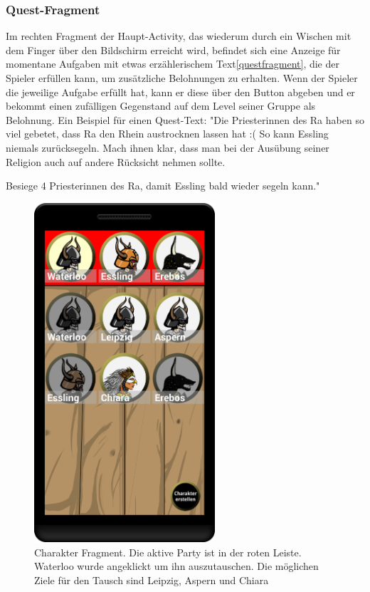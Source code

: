 \documentclass[extern,palatino]{cgBA}
\begin{document}
\subsubsection{Quest-Fragment}
Im rechten Fragment der Haupt-Activity, das wiederum durch ein Wischen mit dem Finger über den Bildschirm erreicht wird, befindet sich eine Anzeige für momentane Aufgaben mit etwas erzählerischem Text\ref{questfragment}, die der Spieler erfüllen kann, um zusätzliche Belohnungen zu erhalten. Wenn der Spieler die jeweilige Aufgabe erfüllt hat, kann er diese über den Button abgeben und er bekommt einen zufälligen Gegenstand auf dem Level seiner Gruppe als Belohnung.
Ein Beispiel für einen Quest-Text: "Die Priesterinnen des Ra haben so viel gebetet, dass Ra den Rhein austrocknen lassen hat :(
So kann Essling niemals zurücksegeln. Mach ihnen klar, dass man bei der Ausübung seiner Religion auch auf andere Rücksicht nehmen sollte.

Besiege 4 Priesterinnen des Ra, damit Essling bald wieder segeln kann."

\newpage
\begin{figure}[H] 
	\centering
	\includegraphics[width=0.6\textwidth]{charfragment.png}
	\caption{Charakter Fragment. Die aktive Party ist in der roten Leiste. Waterloo wurde angeklickt um ihn auszutauschen. Die möglichen Ziele für den Tausch sind Leipzig, Aspern und Chiara}
	\label{charfragment}
\end{figure} 
\end{document}
